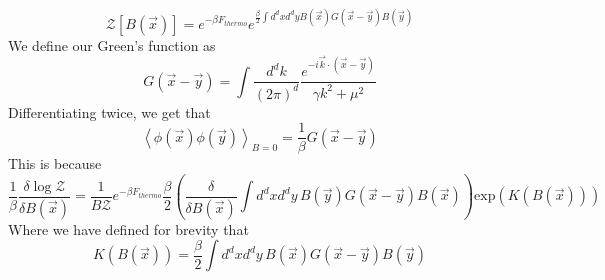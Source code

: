 \documentclass[11pt, oneside]{article}   	%
\begin{document}
\[
	\mathcal{ Z  } [ B ( \vec{x} ) ] = e^{  - \beta F_{ thermo }} e^{ \frac{\beta}{2} \int d^ d x d^ d y  B ( \vec{x} ) G ( \vec{x} - \vec{y} ) B ( \vec{y} )  } 
\]  We define our Green's function as 
\[
	G ( \vec{x} - \vec{y} ) = \int \frac{ d ^ d k }{ ( 2 \pi ) ^ d } \frac{e^{  - i \vec{k} \cdot ( \vec{x} - \vec{y} ) }}{\gamma k^ 2 + \mu ^ 2 } 
\] Differentiating twice, we get that
\[
	\left< \phi ( \vec{x} ) \phi ( \vec{y} )  \right>_{ B = 0 } = \frac{1}{\beta } G ( \vec{x} - \vec{y} )	
\]This is because
\[\frac{1}{\beta } \frac{\delta \log \mathcal{ Z}}{\delta B ( \vec{x} ) } =  \frac{1}{ B \mathcal{ Z } }e^{  - \beta F_{ thermo } } \frac{\beta}{2 } \left(  \frac{ \delta }{ \delta B ( \vec{x} ) } \int d^ d x d^ d y \, B ( \vec{y} ) G( \vec{x} - \vec{y} ) B ( \vec{x} )   \right) \text{exp} ( K ( B ( \vec{x} ) ) )  \]
Where we have defined for brevity that 
\[
	K ( B ( \vec{x} ) ) = \frac{\beta  }{2 }\int d^ d x d^ d y \, B ( \vec{x} ) G ( \vec{x} - \vec{y} ) B ( \vec{y} ) 
\] 
\end{document}
